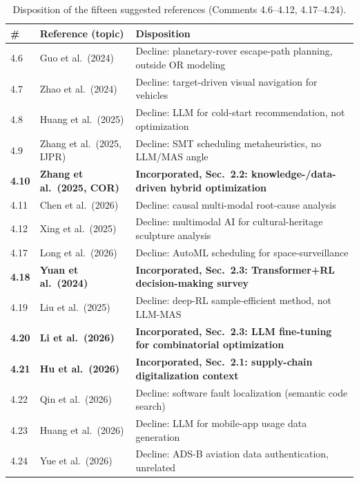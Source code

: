 \documentclass[11pt,a4paper]{article}
\begin{document}
\begin{table}[htbp]
\centering
\small
\caption{Disposition of the fifteen suggested references (Comments 4.6--4.12, 4.17--4.24).}\label{tab:ref_disposition}
\begin{tabular}{llp{8cm}}
\toprule
\# & Reference (topic) & Disposition \\
\midrule
4.6  & Guo et al.\ (2024) & Decline: planetary-rover escape-path planning, outside OR modeling \\
4.7  & Zhao et al.\ (2024) & Decline: target-driven visual navigation for vehicles \\
4.8  & Huang et al.\ (2025) & Decline: LLM for cold-start recommendation, not optimization \\
4.9  & Zhang et al.\ (2025, IJPR) & Decline: SMT scheduling metaheuristics, no LLM/MAS angle \\
\textbf{4.10} & \textbf{Zhang et al.\ (2025, COR)} & \textbf{Incorporated, Sec.~2.2: knowledge-/data-driven hybrid optimization} \\
4.11 & Chen et al.\ (2026) & Decline: causal multi-modal root-cause analysis \\
4.12 & Xing et al.\ (2025) & Decline: multimodal AI for cultural-heritage sculpture analysis \\
4.17 & Long et al.\ (2026) & Decline: AutoML scheduling for space-surveillance \\
\textbf{4.18} & \textbf{Yuan et al.\ (2024)} & \textbf{Incorporated, Sec.~2.3: Transformer+RL decision-making survey} \\
4.19 & Liu et al.\ (2025) & Decline: deep-RL sample-efficient method, not LLM-MAS \\
\textbf{4.20} & \textbf{Li et al.\ (2026)} & \textbf{Incorporated, Sec.~2.3: LLM fine-tuning for combinatorial optimization} \\
\textbf{4.21} & \textbf{Hu et al.\ (2026)} & \textbf{Incorporated, Sec.~2.1: supply-chain digitalization context} \\
4.22 & Qin et al.\ (2026) & Decline: software fault localization (semantic code search) \\
4.23 & Huang et al.\ (2026) & Decline: LLM for mobile-app usage data generation \\
4.24 & Yue et al.\ (2026) & Decline: ADS-B aviation data authentication, unrelated \\
\bottomrule
\end{tabular}
\end{table}
\end{document}

